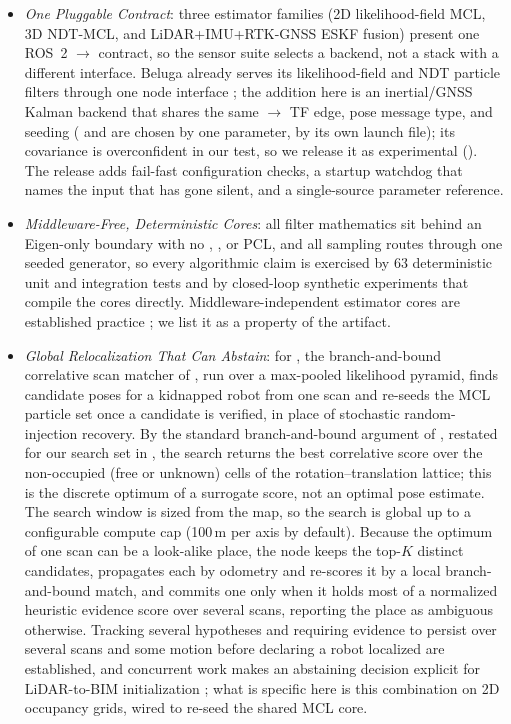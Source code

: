 \begin{itemize}
  \item \emph{One Pluggable Contract}: three estimator families (2D likelihood-field MCL, 3D NDT-MCL, and LiDAR+IMU+RTK-GNSS ESKF fusion) present one ROS~2 $\to$ contract, so the sensor suite selects a backend, not a stack with a different interface. Beluga already serves its likelihood-field and NDT particle filters through one node interface \citep{puga2024beluga,ekumen2022belugarepo}; the addition here is an inertial/GNSS Kalman backend that shares the same $\to$ TF edge, pose message type, and  seeding ( and  are chosen by one  parameter,  by its own launch file); its covariance is overconfident in our test, so we release it as experimental (). The release adds fail-fast configuration checks, a startup watchdog that names the input that has gone silent, and a single-source parameter reference.
  \item \emph{Middleware-Free, Deterministic Cores}: all filter mathematics sit behind an Eigen-only boundary with no , , or PCL, and all sampling routes through one seeded generator, so every algorithmic claim is exercised by 63 deterministic unit and integration tests and by closed-loop synthetic experiments that compile the cores directly. Middleware-independent estimator cores are established practice \citep{puga2024beluga,pedrosa2019lama}; we list it as a property of the artifact.
  \item \emph{Global Relocalization That Can Abstain}: for , the branch-and-bound correlative scan matcher of \citet{hess2016realtime}, run over a max-pooled likelihood pyramid, finds candidate poses for a kidnapped robot from one scan and re-seeds the MCL particle set once a candidate is verified, in place of stochastic random-injection recovery. By the standard branch-and-bound argument of \citet{hess2016realtime}, restated for our search set in , the search returns the best correlative score over the non-occupied (free or unknown) cells of the rotation--translation lattice; this is the discrete optimum of a surrogate score, not an optimal pose estimate. The search window is sized from the map, so the search is global up to a configurable compute cap (100\,m per axis by default). Because the optimum of one scan can be a look-alike place, the node keeps the top-$K$ distinct candidates, propagates each by odometry and re-scores it by a local branch-and-bound match, and commits one only when it holds most of a normalized heuristic evidence score over several scans, reporting the place as ambiguous otherwise. Tracking several hypotheses \citep{gao2019global,garcia2023mhamcl} and requiring evidence to persist over several scans and some motion before declaring a robot localized \citep{adurthi2023scan} are established, and concurrent work makes an abstaining decision explicit for LiDAR-to-BIM initialization \citep{zhang2026movefirst}; what is specific here is this combination on 2D occupancy grids, wired to re-seed the shared MCL core.

\end{itemize}
